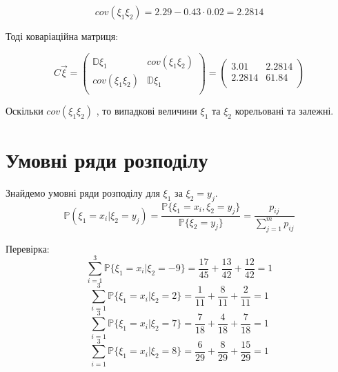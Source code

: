 \documentclass[14pt, a4paper, ukrainian]{extreport}
\begin{document}
	$$ cov(\xi_1\xi_2) = 2.29 - 0.43\cdot0.02 = 2.2814 $$
	
	Тоді коваріаційна матриця:
	
	$$ C{\vec\xi} = \begin{pmatrix}
		\mathbb{D}\xi_1 & cov(\xi_1\xi_2)\\
		cov(\xi_1\xi_2) & \mathbb{D}\xi_1\\
	\end{pmatrix} = 
	\begin{pmatrix}
		3.01 & 2.2814\\
		2.2814 & 61.84\\
	\end{pmatrix}
	$$
	
	Оскільки $ cov(\xi_1\xi_2) $ , то випадкові величини $\xi_1$ та $\xi_2$ корельовані та залежні. 
	\section{Умовні ряди розподілу}
	Знайдемо умовні ряди розподілу для $\xi_1$ за $\xi_2 = y_j$.
	$$\mathbb{P}(\xi_1=x_i|\xi_2=y_j) = \frac{\mathbb{P}\{ \xi_1 = x_i, \xi_2 = y_j\}}{\mathbb{P}\{\xi_2=y_j\}} = \frac{p_{ij}}{\sum_{j=1}^{m}p_{ij}}$$
	
	\begin{table}[H]
		\caption{\label{tab:px|py}Умовні ряди розподілу для $\xi_1$ за $\xi_2 = y_j$}
		\begin{center}
		\end{center}
	\end{table}

	Перевірка:
	$$ \sum_{i=1}^{3}\mathbb{P}\{\xi_1 = x_i | \xi_2=-9\} = \frac{17}{45} + \frac{13}{42} + \frac{12}{42} = 1$$
	$$ \sum_{i=1}^{3}\mathbb{P}\{\xi_1 = x_i | \xi_2=2\} = 
	\frac{1}{11} + \frac{8}{11} + \frac{2}{11} = 1$$
	$$ \sum_{i=1}^{3}\mathbb{P}\{\xi_1 = x_i | \xi_2=7\} = 
	\frac{7}{18} + \frac{4}{18} + \frac{7}{18} = 1$$
	$$ \sum_{i=1}^{3}\mathbb{P}\{\xi_1 = x_i | \xi_2=8\} = \frac{6}{29} + \frac{8}{29} + \frac{15}{29} = 1$$
	
\end{document}
